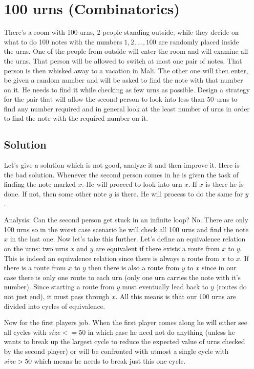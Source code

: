 \section{100 urns (Combinatorics)}
There's a room with 100 urns, 2 people standing outside, while they decide on what to do 100 notes with the numbers $1, 2, \ldots,100$ are randomly placed inside the urns. One of the people from outside will enter the room and will examine all the urns. That person will be allowed to switch at most one pair of notes. That person is then whisked away to a vacation in Mali. The other one will then enter, be given a random number and will be asked to find the note with that number on it. He needs to find it while checking as few urns as possible. Design a strategy for the pair that will allow the second person to look into less than 50 urns to find any number required and in general look at the least number of urns in order to find the note with the required number on it.

\subsection{Solution}
Let's give a solution which is not good, analyze it and then improve it.
Here is the bad solution. Whenever the second person comes in he is given the task of finding the note marked $x$. He will proceed to look into urn $x$. If $x$ is there he is done. If not, then some other note $y$ is there. He will process to do the same for $y$.

Analysis: Can the second person get stuck in an infinite loop? No. There are only 100 urns so in the worst case scenario he will check all 100 urns and find the note $x$ in the last one. Now let's take this further. Let's define an equivalence relation on the urns: two urns $x$ and $y$ are equivalent if there exists a route from $x$ to $y$. This is indeed an equivalence relation since there is always a route from $x$ to $x$. If there is a route from $x$ to $y$ then there is also a route from $y$ to $x$ since in our case there is only one route to each urn (only one urn carries the note with it's number). Since starting a route from $y$ must eventually lead back to $y$ (routes do not just end), it must pass through $x$. All this means is that our 100 urns are divided into cycles of equivalence.

Now for the first players job. When the first player comes along he will either see all cycles with $size<=50$ in which case he need not do anything (unless he wants to break up the largest cycle to reduce the expected value of urns checked by the second player) or will be confronted with utmost a single cycle with $size > 50$ which means he needs to break just this one cycle.

